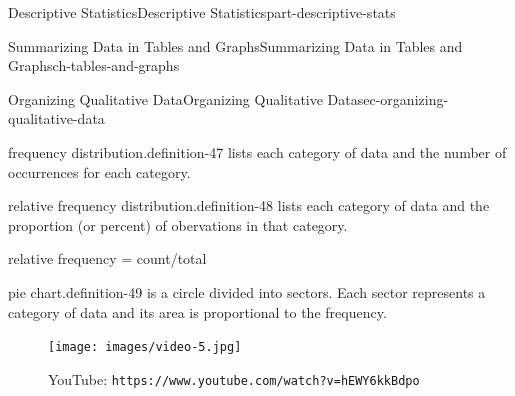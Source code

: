 \documentclass[oneside,10pt,]{book}
\newcommand{\mono}[1]{\texttt{#1}}
\numberwithin{equation}{section}
\newlength{\qrsize}
\newlength{\previewwidth}
\begin{document}
\begin{partptx}{Descriptive Statistics}{}{Descriptive Statistics}{}{}{part-descriptive-stats}
%
\typeout{************************************************}
\typeout{************************************************}
%
\begin{chapterptx}{Summarizing Data in Tables and Graphs}{}{Summarizing Data in Tables and Graphs}{}{}{ch-tables-and-graphs}
%
%
\typeout{************************************************}
\typeout{************************************************}
%
\begin{sectionptx}{Organizing Qualitative Data}{}{Organizing Qualitative Data}{}{}{sec-organizing-qualitative-data}
\begin{definition}{frequency distribution.}{definition-47}%
\hypertarget{p-34}{}%
lists each category of data and the number of occurrences for each category.%
\end{definition}
\begin{definition}{relative frequency distribution.}{definition-48}%
\hypertarget{p-35}{}%
lists each category of data and the proportion (or percent) of obervations in that category.%
\par
\hypertarget{p-36}{}%
relative frequency = count\slash{}total%
\end{definition}
\begin{definition}{pie chart.}{definition-49}%
\hypertarget{p-37}{}%
is a circle divided into sectors. Each sector represents a category of data and its area is proportional to the frequency.%
\end{definition}
\begin{figure}
\centering
\setlength{\qrsize}{9em}
\setlength{\previewwidth}{\linewidth}
\addtolength{\previewwidth}{-\qrsize}
\begin{tcbraster}[raster columns=2, raster column skip=1pt, raster halign=center, raster force size=false, raster left skip=0pt, raster right skip=0pt]%
\begin{tcolorbox}[previewstyle, width=\previewwidth]%
\texttt{[image: images/video-5.jpg]}%
\end{tcolorbox}%
\begin{tcolorbox}[qrstyle]%
{\hypersetup{urlcolor=black}}%
\end{tcolorbox}%
\begin{tcolorbox}[captionstyle]%
\small YouTube: \mono{https://www.youtube.com/watch?v=hEWY6kkBdpo}\end{tcolorbox}%

\end{tcbraster}
\end{figure}
\end{sectionptx}
\end{chapterptx}
\end{partptx}
\end{document}
